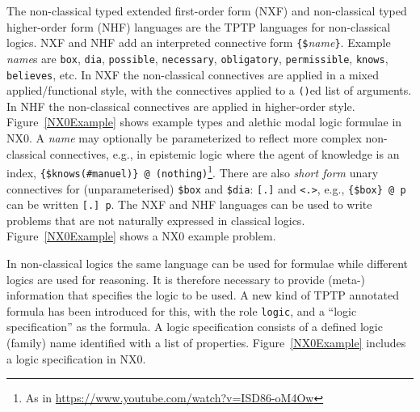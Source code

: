 \documentclass[runningheads]{llncs}
\begin{document}
The non-classical typed extended first-order form (NXF) and non-classical typed higher-order 
form (NHF) languages are the TPTP languages for non-classical logics.
NXF and NHF add an interpreted connective form
{\tt \verb|{|\$}{\em name}{\tt \verb|}|}.
Example {\em name}s are {\tt box}, {\tt dia}, {\tt possible}, {\tt necessary},
{\tt obligatory}, {\tt permissible}, {\tt knows}, {\tt believes}, etc.
In NXF the non-classical connectives are applied in a mixed applied/functional style, with the 
connectives applied to a {\tt ()}ed list of arguments.
In NHF the non-classical connectives are applied in higher-order style.
Figure~\ref{NX0Example} shows example types and alethic modal logic formulae in NX0.
A {\em name} may optionally be parameterized to reflect more complex non-classical connectives, 
e.g., in epistemic logic where the agent of knowledge is an index,
{\tt \verb|{|\$knows(\#manuel)\verb|}| @ (nothing)}\footnote{%
As in \url{https://www.youtube.com/watch?v=ISD86-oM4Ow}}.
There are also {\em short form} unary connectives for (unparameterised) {\tt \$box} and 
{\tt \$dia}: {\tt [.]} and {\tt <.>}, e.g., {\tt \verb|{|\$box\verb|}| @ p} can be written 
{\tt [.] p}.
The NXF and NHF languages can be used to write problems that are not naturally expressed in
classical logics.
Figure~\ref{NX0Example} shows a NX0 example problem.

In non-classical logics the same language can be used for formulae while different logics are 
used for reasoning.
It is therefore necessary to provide \mbox{(meta-)} information that specifies the
logic to be used.
A new kind of TPTP annotated formula has been introduced for this, with the role \texttt{logic},
and a ``logic specification'' as the formula.
A logic specification consists of a defined logic (family) name identified with a list of 
properties.
Figure~\ref{NX0Example} includes a logic specification in NX0.
\end{document}
